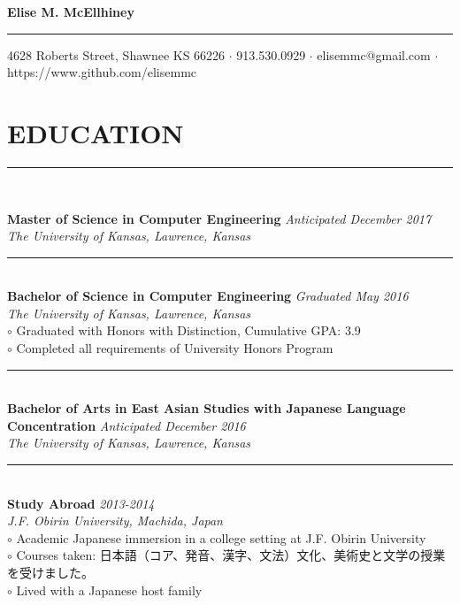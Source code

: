\documentclass[twoside]{article}
\begin{document}
\begingroup
	\fontsize{20pt}{12pt}\selectfont
	\textbf{Elise M. McEllhiney}\\
\endgroup
\rule{\textwidth}{1.5pt}
\begin{center}
\vspace{-0.6em}
\small{4628 Roberts Street, Shawnee KS 66226 $\cdot$ 913.530.0929 $\cdot$ elisemmc@gmail.com $\cdot$ https://www.github.com/elisemmc}
\end{center}

\fontsize{9pt}{11pt}\selectfont

\section*{EDUCATION}
\vspace{-1em}
\rule{\textwidth}{1pt}\\
\begin{adjustwidth}{0.2in}{0in}
\vspace{-1em}
\textbf{Master of Science in Computer Engineering} \hfill \textit{Anticipated December 2017}\\
\textit{The University of Kansas, Lawrence, Kansas}\\
\rule{7.3in}{0.5pt}\\
\textbf{Bachelor of Science in Computer Engineering} \hfill \textit{Graduated May 2016}\\
\textit{The University of Kansas, Lawrence, Kansas}\\
$\circ$ Graduated with Honors with Distinction, Cumulative GPA: 3.9\\
$\circ$ Completed all requirements of University Honors Program\\
\rule{7.3in}{0.5pt}\\
\textbf{Bachelor of Arts in East Asian Studies with Japanese Language Concentration} \hfill \textit{Anticipated December 2016}\\
\textit{The University of Kansas, Lawrence, Kansas}\\
\rule{7.3in}{0.5pt}\\
\textbf{Study Abroad} \hfill \textit{2013-2014}\\
\textit{J.F. Obirin University, Machida, Japan}\\
$\circ$ Academic Japanese immersion in a college setting at J.F. Obirin University\\
$\circ$ Courses taken: 日本語（コア、発音、漢字、文法）文化、美術史と文学の授業を受けました。\\
$\circ$ Lived with a Japanese host family\\
\end{adjustwidth}
\end{document}
